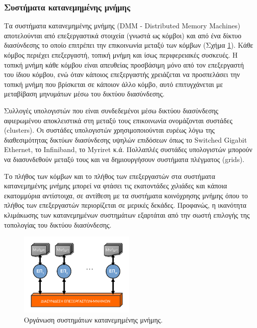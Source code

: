 \subsubsection{Συστήματα κατανεμημένης μνήμης}
Τα συστήματα κατανεμημένης μνήμης (DMM - Distributed Memory Machines) αποτελούνται από επεξεργαστικά στοιχεία (γνωστά ως κόμβοι) και από ένα δίκτυο διασύνδεσης το οποίο επιτρέπει την επικοινωνία μεταξύ των κόμβων (Σχήμα \ref{fig:dmm}). Κάθε κόμβος περιέχει επεξεργαστή, τοπική μνήμη και ίσως περιφερειακές συσκευές. Η τοπική μνήμη κάθε κόμβου είναι απευθείας προσβάσιμη μόνο από τον επεξεργαστή του ίδιου κόμβου, ενώ όταν κάποιος επεξεργαστής χρειάζεται να προσπελάσει την τοπική μνήμη που βρίσκεται σε κάποιον άλλο κόμβο, αυτό επιτυγχάνεται με μεταβίβαση μηνυμάτων μέσω του δικτύου διασύνδεσης. 

Συλλογές υπολογιστών που είναι συνδεδεμένοι μέσω δικτύου διασύνδεσης αφιερωμένου αποκλειστικά στη μεταξύ τους επικοινωνία ονομάζονται συστάδες (clusters). Οι συστάδες υπολογιστών χρησιμοποιούνται ευρέως λόγω της διαθεσιμότητας δικτύων διασύνδεσης υψηλών επιδόσεων όπως το Switched Gigabit Ethernet, το Infiniband, το Myriret κ.ά. Πολλαπλές συστάδες υπολογιστών μπορούν να διασυνδεθούν μεταξύ τους και να δημιουργήσουν συστήματα πλέγματος (grids).

Το πλήθος των κόμβων και το πλήθος των επεξεργαστών στα συστήματα κατανεμημένης μνήμης μπορεί να φτάσει τις εκατοντάδες χιλιάδες και κάποια εκατομμύρια αντίστοιχα, σε αντίθεση με τα συστήματα κοινόχρησης μνήμης όπου το πλήθος των επεξεργαστών περιορίζεται σε μερικές δεκάδες. Προφανώς, η ικανότητα κλιμάκωσης των κατανεμημένων συστημάτων εξαρτάται από την σωστή επιλογής της τοπολογίας του δικτύου διασύνδεσης.

\begin{figure}[t]
	\centering
	\includegraphics[width=0.5\textwidth]{Figures/dmm.png}
	\linebreak 
	\caption{Οργάνωση συστημάτων κατανεμημένης μνήμης.}
	\label{fig:dmm}
\end{figure}


